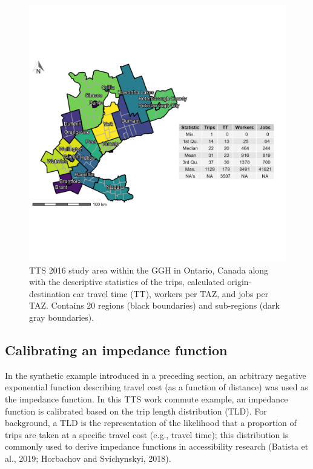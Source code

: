 \documentclass[]{elsarticle} %
\begin{document}
\begin{figure}

{\centering \includegraphics[width=1\linewidth]{images/TTS16-survey-area} 

}

\caption{\label{fig:TTS-16-survey-area}TTS 2016 study area within the GGH in Ontario, Canada along with the descriptive statistics of the trips, calculated origin-destination car travel time (TT), workers per TAZ, and jobs per TAZ. Contains 20 regions (black boundaries) and sub-regions (dark gray boundaries).}\label{fig:TTS-16-survey-area}
\end{figure}

\hypertarget{calibrating-an-impedance-function}{%
\subsection{Calibrating an impedance
function}\label{calibrating-an-impedance-function}}

In the synthetic example introduced in a preceding section, an arbitrary
negative exponential function describing travel cost (as a function of
distance) was used as the impedance function. In this TTS work commute
example, an impedance function is calibrated based on the trip length
distribution (TLD). For background, a TLD is the representation of the
likelihood that a proportion of trips are taken at a specific travel
cost (e.g., travel time); this distribution is commonly used to derive
impedance functions in accessibility research (Batista et al., 2019;
Horbachov and Svichynskyi, 2018).
\end{document}
